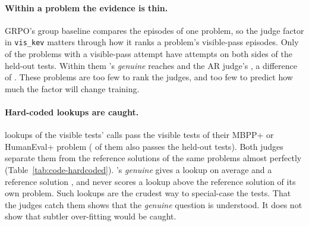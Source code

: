 \begin{table}[t]
\centering\small

\caption{AUROC of each judge signal for passing the held-out tests, among the base policy's attempts that pass the
visible tests ( attempts per problem at temperature 1). \emph{within}: mean AUROC within the
 problems that have visible-pass attempts both passing and failing the held-out tests. \emph{all
pass}: AUROC for passing every test, over all attempts. 95\% intervals from resampling problems.}
\label{tab:code-study}
\end{table}

\paragraph{Within a problem the evidence is thin.} GRPO's group baseline compares the episodes of one problem, so the
judge factor in \texttt{vis\_kev} matters through how it ranks a problem's visible-pass episodes. Only
 of the  problems with a visible-pass attempt have attempts on both sides of the
held-out tests. Within them \kev{}'s \emph{genuine} reaches  and the AR judge's
, a difference of 
. These problems are too few to rank the judges, and too few to
predict how much the factor will change training.

\paragraph{Hard-coded lookups are caught.}  lookups of the visible tests' calls pass the visible tests
of their MBPP+ or HumanEval+ problem ( of them also passes the held-out tests). Both judges
separate them from the reference solutions of the same problems almost perfectly (Table~\ref{tab:code-hardcoded}).
\kev{}'s \emph{genuine} gives a lookup  on average and a reference solution , and never
scores a lookup above the reference solution of its own problem. Such lookups are the crudest way to special-case the
tests. That the judges catch them shows that the \emph{genuine} question is understood. It does not show that subtler
over-fitting would be caught.

\begin{table}[t]
\centering\small

\caption{Reference solutions against hard-coded lookups of the visible tests, on the  MBPP+ and
HumanEval+ problems whose visible tests allow a lookup: AUROC, mean $p(\text{yes})$ of each kind, and how often the
lookup scores above its own problem's reference solution.}
\label{tab:code-hardcoded}
\end{table}

